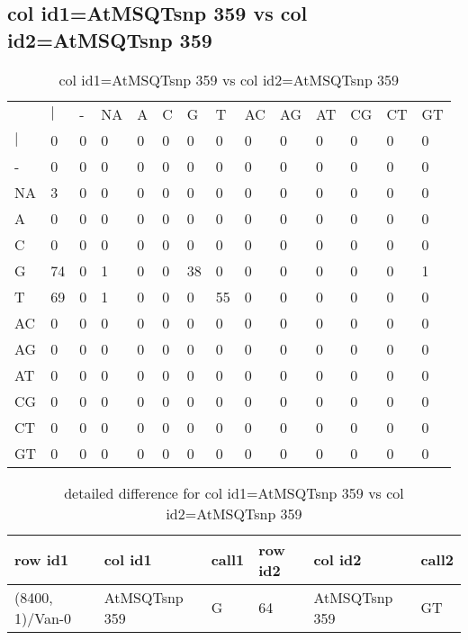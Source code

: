 \subsection{col id1=AtMSQTsnp 359 vs col id2=AtMSQTsnp 359}
\begin{center}
\begin{longtable}{|l|l|l|l|l|l|l|l|l|l|l|l|l|l|}
\caption{col id1=AtMSQTsnp 359 vs col id2=AtMSQTsnp 359} \label{table_dm678}\\
\hline
\\
\hline
&$|$&-&NA&A&C&G&T&AC&AG&AT&CG&CT&GT\\
$|$&0&0&0&0&0&0&0&0&0&0&0&0&0\\
-&0&0&0&0&0&0&0&0&0&0&0&0&0\\
NA&3&0&0&0&0&0&0&0&0&0&0&0&0\\
A&0&0&0&0&0&0&0&0&0&0&0&0&0\\
C&0&0&0&0&0&0&0&0&0&0&0&0&0\\
G&74&0&1&0&0&38&0&0&0&0&0&0&1\\
T&69&0&1&0&0&0&55&0&0&0&0&0&0\\
AC&0&0&0&0&0&0&0&0&0&0&0&0&0\\
AG&0&0&0&0&0&0&0&0&0&0&0&0&0\\
AT&0&0&0&0&0&0&0&0&0&0&0&0&0\\
CG&0&0&0&0&0&0&0&0&0&0&0&0&0\\
CT&0&0&0&0&0&0&0&0&0&0&0&0&0\\
GT&0&0&0&0&0&0&0&0&0&0&0&0&0\\
\hline
\end{longtable}
\end{center}

\begin{center}
\begin{longtable}{|l|l|l|l|l|l|}
\caption{detailed difference for col id1=AtMSQTsnp 359 vs col id2=AtMSQTsnp 359} \label{table_dm679}\\
\hline
row id1&col id1&call1&row id2&col id2&call2\\
\hline
(8400, 1)/Van-0&AtMSQTsnp 359&G&64&AtMSQTsnp 359&GT\\
\hline
\end{longtable}
\end{center}

